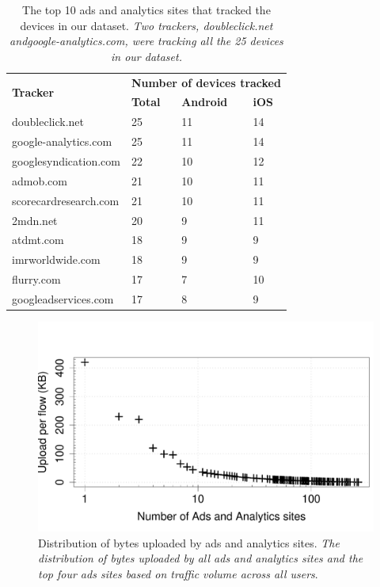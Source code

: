 \begin{table}
\begin{small}
\begin{tabular}{|p{}|p{}|p{}|p{}|}
\hline
\multirow{2}{*}{\bf Tracker} & \multicolumn{3}{c|}{\bf Number of devices tracked}\tabularnewline
\cline{2-4}
   &  {\bf Total} & {\bf Android} & {\bf iOS} \tabularnewline
\hline
doubleclick.net & 25 & 11 & 14 \tabularnewline
\hline
google-analytics.com   & 25 & 11 & 14 \tabularnewline
\hline
googlesyndication.com  & 22 & 10 & 12 \tabularnewline
\hline
admob.com  & 21 & 10 & 11 \tabularnewline
\hline
scorecardresearch.com &  21 & 10 & 11 \tabularnewline
\hline
2mdn.net  &  20 & 9 &  11 \tabularnewline
\hline
atdmt.com  & 18 & 9 &  9 \tabularnewline
\hline
imrworldwide.com & 18 &  9 &  9 \tabularnewline
\hline
flurry.com & 17 & 7 &  10 \tabularnewline
\hline
googleadservices.com  & 17 & 8 &  9 \tabularnewline
\hline
\end{tabular}
\end{small}
\caption{The top 10 ads and analytics sites that tracked the devices in our dataset.
\emph{Two trackers, \emph{doubleclick.net} and\emph{google-analytics.com}, were tracking all the 25 devices in our dataset.}}
\label{tab:top_trackers}
\end{table}
\begin{figure}
\includegraphics[width=\columnwidth]{plots/num_uploading_trackers.pdf}
\caption{Distribution of bytes uploaded by ads and analytics sites. \emph{The distribution of bytes uploaded by all ads and analytics sites and the top four ads sites based on traffic volume across all users}.}
\label{fig:description}
\end{figure}


